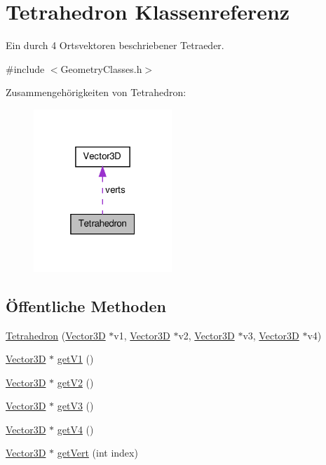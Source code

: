 \hypertarget{classTetrahedron}{\section{Tetrahedron Klassenreferenz}
\label{classTetrahedron}
}


Ein durch 4 Ortsvektoren beschriebener Tetraeder.  




{\ttfamily \#include $<$Geometry\-Classes.\-h$>$}



Zusammengehörigkeiten von Tetrahedron\-:\nopagebreak
\begin{figure}[H]
\begin{center}
\leavevmode
\includegraphics[width=148pt]{classTetrahedron__coll__graph}
\end{center}
\end{figure}
\subsection*{Öffentliche Methoden}
\begin{DoxyCompactItemize}
\item 
\hyperlink{classTetrahedron_a84e19dba5735a455269abca8229b4bb4}{Tetrahedron} (\hyperlink{classVector3D}{Vector3\-D} $\ast$v1, \hyperlink{classVector3D}{Vector3\-D} $\ast$v2, \hyperlink{classVector3D}{Vector3\-D} $\ast$v3, \hyperlink{classVector3D}{Vector3\-D} $\ast$v4)
\item 
\hyperlink{classVector3D}{Vector3\-D} $\ast$ \hyperlink{classTetrahedron_add51e42ab17afbd023d47a436ce24b0d}{get\-V1} ()
\item 
\hyperlink{classVector3D}{Vector3\-D} $\ast$ \hyperlink{classTetrahedron_aa728c967f17e2b8408009b5f2b77a17a}{get\-V2} ()
\item 
\hyperlink{classVector3D}{Vector3\-D} $\ast$ \hyperlink{classTetrahedron_aa539a97f133ea621520121acb2ef4a7e}{get\-V3} ()
\item 
\hyperlink{classVector3D}{Vector3\-D} $\ast$ \hyperlink{classTetrahedron_a7308b7b73edeba7782dff551a03095bf}{get\-V4} ()
\item 
\hyperlink{classVector3D}{Vector3\-D} $\ast$ \hyperlink{classTetrahedron_a88afe41ae5991168ad51ba4dbb2e1a6b}{get\-Vert} (int index)
\end{DoxyCompactItemize}
